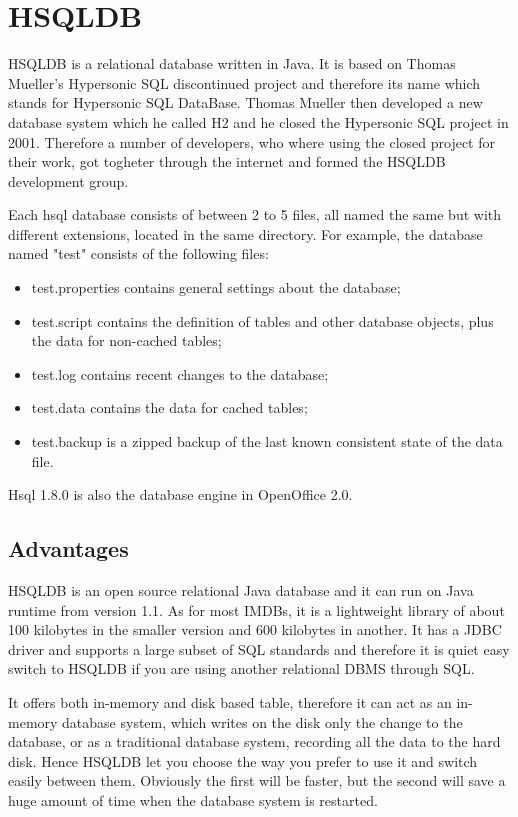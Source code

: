 		\section{HSQLDB}
HSQLDB is a relational database written in Java. It is based on Thomas Mueller's Hypersonic SQL discontinued project and therefore its name which stands for Hypersonic SQL DataBase. Thomas Mueller then developed a new database system which he called H2 and he closed the Hypersonic SQL project in 2001. Therefore a number of developers, who where using the closed project for their work, got togheter through the internet and formed the HSQLDB development group.

Each hsql database consists of between 2 to 5 files, all named the same but with different extensions, located in the same directory. For example, the database named "test" consists of the following files:
\begin{itemize}
	\item test.properties contains general settings about the database;
	\item test.script contains the definition of tables and other database objects, plus the data for non-cached tables;
	\item test.log contains recent changes to the database;
	\item test.data contains the data for cached tables;
	\item test.backup is a zipped backup of the last known consistent state of the data file.
\end{itemize}

Hsql 1.8.0 is also the database engine in OpenOffice 2.0.
		
			\subsection{Advantages}
HSQLDB is an open source relational Java database and it can run on Java runtime from version 1.1. As for most IMDBs, it is a lightweight library of about 100 kilobytes in the smaller version and 600 kilobytes in another. It has a JDBC driver and supports a large subset of SQL standards and therefore it is quiet easy switch to HSQLDB if you are using another relational DBMS through SQL.

It offers both in-memory and disk based table, therefore it can act as an in-memory database system, which writes on the disk only the change to the database, or as a traditional database system, recording all the data to the hard disk. Hence HSQLDB let you choose the way you prefer to use it and switch easily between them. Obviously the first will be faster, but the second will save a huge amount of time when the database system is restarted.

